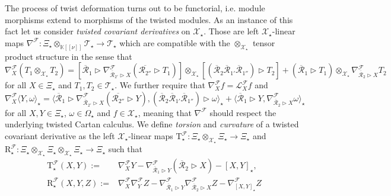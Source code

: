 \documentclass[a4paper,11pt]{article}
\begin{document}
The process of twist deformation turns out to be functorial, i.e. module
morphisms extend to morphisms of the twisted modules. As an instance of this fact let us
consider \textit{twisted covariant derivatives} \cite{AschieriCastellani2009}
on $\mathcal{X}_\star$. Those are
left $\mathcal{X}_\star$-linear maps
$\nabla^\mathcal{F}\colon\Xi_\star\otimes_{\mathbb{K}[[\nu]]}\mathcal{T}_\star
\rightarrow\mathcal{T}_\star$ which are compatible with the $\otimes_{\mathcal{X}_\star}$
tensor product structure in the sense that
\begin{equation}\label{eq03}
    \nabla^\mathcal{F}_X(T_1\otimes_{\mathcal{X}_\star} T_2)
    =[\overline{\mathcal{R}}_1\rhd\nabla^\mathcal{F}_{\overline{\mathcal{R}}_{2'}\rhd X}(\overline{\mathcal{R}_{2''}}\rhd T_1)]\otimes_{\mathcal{X}_\star}
    [(\overline{\mathcal{R}}_2\overline{\mathcal{R}}_{1'}\overline{\mathcal{R}}_{1''})
    \rhd T_2]
    +(\overline{\mathcal{R}}_1\rhd T_1)\otimes_{\mathcal{X}_\star}\nabla^\mathcal{F}_{
    \overline{\mathcal{R}}_2\rhd X}T_2
\end{equation}
for all $X\in\Xi_\star$ and $T_1,T_2\in\mathcal{T}_\star$. We further require that
$\nabla^\mathcal{F}_Xf=\mathcal{L}^\mathcal{F}_Xf$ and
\begin{equation}\label{eq04}
    \nabla^\mathcal{F}_X\langle Y,\omega\rangle_\star
    =\langle\overline{\mathcal{R}}_1\rhd\nabla^\mathcal{F}_{\overline{\mathcal{R}}_{2'}\rhd X}(\overline{\mathcal{R}_{2''}}\rhd Y),
    (\overline{\mathcal{R}}_2\overline{\mathcal{R}}_{1'}\overline{\mathcal{R}}_{1''})
    \rhd\omega\rangle_\star
    +\langle\overline{\mathcal{R}}_1\rhd Y,\nabla^\mathcal{F}_{
    \overline{\mathcal{R}}_2\rhd X}\omega\rangle_\star
\end{equation}
for all $X,Y\in\Xi_\star$, $\omega\in\Omega_\star$ and $f\in\mathcal{X}_\star$,
meaning that $\nabla^\mathcal{F}$ should respect the underlying twisted Cartan calculus.
We define \textit{torsion} and \textit{curvature} of a twisted covariant derivative as
the left $\mathcal{X}_\star$-linear maps
$\mathrm{T}^\mathcal{F}_\star\colon\Xi_\star\otimes_{\mathcal{X}_\star}\Xi_\star
\rightarrow\Xi_\star$ and
$\mathrm{R}^\mathcal{F}_\star\colon\Xi_\star\otimes_{\mathcal{X}_\star}\Xi_\star
\otimes_{\mathcal{X}_\star}\Xi_\star
\rightarrow\Xi_\star$
such that
\begin{equation}
\begin{split}
    \mathrm{T}^\mathcal{F}_\star(X,Y)
    :=&\nabla^\mathcal{F}_XY
    -\nabla^\mathcal{F}_{\overline{\mathcal{R}}_1\rhd Y}
    (\overline{\mathcal{R}}_2\rhd X)-[X,Y]_\star,\\
    \mathrm{R}^\mathcal{F}_\star(X,Y,Z)
    :=&\nabla^\mathcal{F}_X\nabla^\mathcal{F}_YZ
    -\nabla^\mathcal{F}_{\overline{\mathcal{R}}_1\rhd Y}
    \nabla^\mathcal{F}_{\overline{\mathcal{R}}_2\rhd X}Z
    -\nabla^\mathcal{F}_{[X,Y]_\star}Z
\end{split}
\end{equation}
\end{document}
